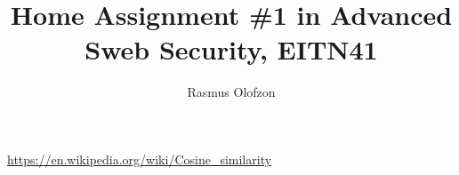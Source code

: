 \documentclass[a4paper]{article}
\title{Home Assignment \#1 in Advanced Sweb Security, EITN41}
\author{Rasmus Olofzon}
\begin{document}
\maketitle

\begin{thebibliography}{9}
   \url{https://en.wikipedia.org/wiki/Cosine_similarity}
\end{thebibliography}
\end{document}
